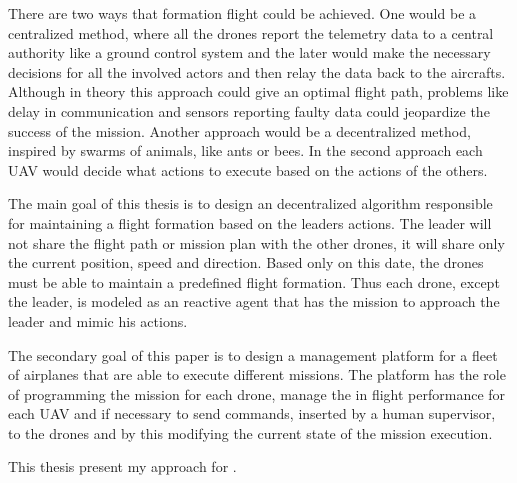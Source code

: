 There are two ways that formation flight could be achieved. One would be a 
centralized method,  where all the drones report the telemetry data to a central
authority like a ground control system and the later would make the necessary 
decisions for all the involved actors and then relay the data back to the aircrafts.
Although in theory this approach could give an optimal flight path,  problems
like delay in communication and sensors reporting faulty data could jeopardize
the success of the mission. Another approach would be a decentralized method, 
inspired by swarms of animals, like ants or bees. In the second approach each 
UAV would decide what actions to execute based on the actions of the others.

The main goal of this thesis is to design an decentralized algorithm responsible
for maintaining a flight formation based on the leaders actions. The leader will
not share the flight path or mission plan with the other drones, it will share
only the current position, speed and direction. Based only on this date, the 
drones must be able to maintain a predefined flight formation. Thus each drone, 
except the leader, is modeled as an reactive agent that has the mission to 
approach the leader and mimic his actions.

The secondary goal of this paper is to design a management platform for a 
fleet of airplanes that are able to execute different missions. The platform has
the role of programming the mission for each drone,  manage the in flight
performance for each UAV and if necessary to send commands, inserted by a human
supervisor, to the drones and by this modifying the current state of the mission
execution.

This thesis present my approach for \project.

